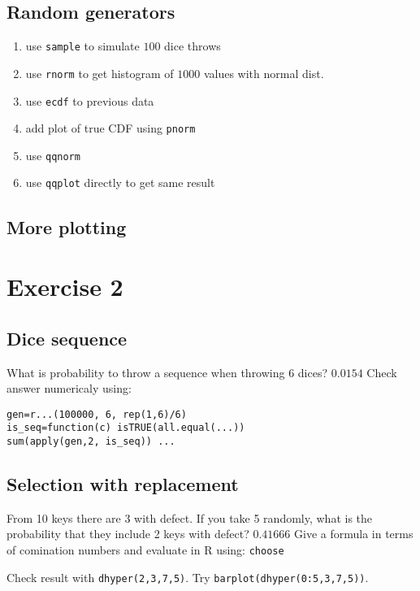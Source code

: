 \documentclass[4pt]{article}
\def\result#1{{\color{green} #1}}
\begin{document}
\subsection{Random generators}
\begin{enumerate}
 \item use \verb'sample' to simulate $100$ dice throws
 \item use \verb'rnorm' to get histogram of $1000$ values with normal dist.
 \item use \verb'ecdf' to previous data 
 \item add plot of true CDF using \verb'pnorm'
 \item use \verb'qqnorm'
 \item use \verb'qqplot' directly to get same result
\end{enumerate}
\pagebreak

\subsection{More plotting}



\pagebreak
\section{Exercise 2}
%
% 

\subsection{Dice sequence}
What is probability to throw a sequence when throwing 6 dices? \result{$0.0154$}
Check answer numericaly using: 
\begin{verbatim}
gen=r...(100000, 6, rep(1,6)/6)
is_seq=function(c) isTRUE(all.equal(...))
sum(apply(gen,2, is_seq)) ...
\end{verbatim}


\subsection{Selection with replacement}
   From 10 keys there are 3 with defect. If you take 5 randomly, what is the 
   probability that they include 2 keys with defect? \result{$0.41666$} Give a formula in terms of comination numbers and evaluate in R
   using: \verb'choose'

   Check result with \verb'dhyper(2,3,7,5)'. Try \verb'barplot(dhyper(0:5,3,7,5))'.
\end{document}
